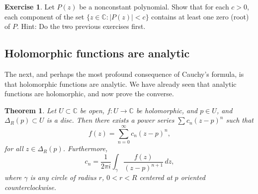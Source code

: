 \documentclass[12pt,openany]{book}
\newcommand{\sabs}[1]{\lvert {#1} \rvert}
\newcommand{\C}{{\mathbb{C}}}
\theoremstyle{plain}
\newtheorem{thm}{Theorem}[section]
\theoremstyle{remark}
\theoremstyle{definition}
\newenvironment{exbox}{%
    \def\FrameCommand{\vrule width 1pt \relax\hspace {10pt}}%
    \MakeFramed {\advance \hsize -\width \FrameRestore }%
}{%
    \endMakeFramed
}
\theoremstyle{exercise}
\newtheorem{exercise}{Exercise}[section]
\theoremstyle{example}
\begin{document}
\begin{exbox}
\begin{exercise}
Let $P(z)$ be a nonconstant polynomial.  Show that for each $c > 0$,
each component of the set $\bigl\{ z \in \C : \sabs{P(z)} < c \bigr\}$
contains at least one zero (root) of $P$.  Hint: Do the two previous
exercises first.
\end{exercise}
\end{exbox}

\subsection{Holomorphic functions are analytic}

The next, and perhaps the most profound consequence of Cauchy's formula, is
that holomorphic functions are analytic.  We have already seen
that analytic functions are holomorphic, and now prove the converse.

\begin{thm} \label{thm:holpower}
Let $U \subset \C$ be open, $f \colon U \to \C$ be
holomorphic, and $p \in U$, and $\Delta_R(p) \subset U$
is a disc.
Then there exists a power series $\sum c_n {(z-p)}^n$
such that
\begin{equation*}
f(z) = \sum_{n=0}^\infty c_n {(z-p)}^n ,
\end{equation*}
for all $z \in \Delta_R(p)$.
Furthermore,
\begin{equation*}
c_n = 
\frac{1}{2\pi i}
\int_{\gamma}
\frac{f(z)}{{(z-p)}^{n+1}}
\,
dz  ,
\end{equation*}
where $\gamma$ is any circle of radius $r$, $0 < r < R$ centered at
$p$ oriented counterclockwise.
\end{thm}
\end{document}
